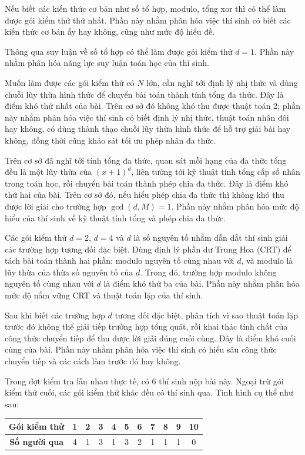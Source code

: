 \documentclass[11pt]{article}
\begin{document}
Nếu biết các kiến thức cơ bản như số tổ hợp, modulo, tổng xor thì có thể làm
được gói kiểm thử thứ nhất. Phần này nhằm phân hóa việc thí sinh có biết các
kiến thức cơ bản ấy hay không, cũng như mức độ hiểu đề.

Thông qua suy luận về số tổ hợp có thể làm được gói kiểm thử \(d=1\). Phần
này nhằm phân hóa năng lực suy luận toán học của thí sinh.

Muốn làm được các gói kiểm thử có \(N\) lớn, cần nghĩ tới định lý nhị thức và
dùng chuỗi lũy thừa hình thức để chuyển bài toán thành tính tổng đa thức. Đây
là điểm khó thứ nhất của bài. Trên cơ sở đó không khó thu được thuật toán 2;
phần này nhằm phân hóa việc thí sinh có biết định lý nhị thức, thuật toán
nhân đôi hay không, có dùng thành thạo chuỗi lũy thừa hình thức để hỗ trợ giải
bài hay không, đồng thời cũng khảo sát tối ưu phép nhân đa thức.

Trên cơ sở đã nghĩ tới tính tổng đa thức, quan sát mỗi hạng của đa thức tổng
đều là một lũy thừa của \((x+1)^d\), liên tưởng tới kỹ thuật tính tổng cấp số
nhân trong toán học, rồi chuyển bài toán thành phép chia đa thức. Đây là điểm
khó thứ hai của bài. Trên cơ sở đó, nếu hiểu phép chia đa thức thì không khó
thu được lời giải cho trường hợp \(\gcd(d,M)=1\). Phần này nhằm phân hóa mức
độ hiểu của thí sinh về kỹ thuật tính tổng và phép chia đa thức.

Các gói kiểm thử \(d=2\), \(d=4\) và \(d\) là số nguyên tố nhằm dẫn dắt thí
sinh giải các trường hợp tương đối đặc biệt. Dùng định lý phần dư Trung Hoa
(CRT) để tách bài toán thành hai phần: modulo nguyên tố cùng nhau với \(d\),
và modulo là lũy thừa của thừa số nguyên tố của \(d\). Trong đó, trường hợp
modulo không nguyên tố cùng nhau với \(d\) là điểm khó thứ ba của bài. Phần
này nhằm phân hóa mức độ nắm vững CRT và thuật toán lặp của thí sinh.

Sau khi biết các trường hợp \(d\) tương đối đặc biệt, phân tích vì sao thuật
toán lặp trước đó không thể giải tiếp trường hợp tổng quát, rồi khai thác
tính chất của công thức chuyển tiếp để thu được lời giải đúng cuối cùng. Đây
là điểm khó cuối cùng của bài. Phần này nhằm phân hóa việc thí sinh có hiểu
sâu công thức chuyển tiếp và các cách làm trước đó hay không.

Trong đợt kiểm tra lẫn nhau thực tế, có 6 thí sinh nộp bài này. Ngoại trừ gói
kiểm thử cuối, các gói kiểm thử khác đều có thí sinh qua. Tình hình cụ thể như
sau:

\begin{center}
\begin{tabular}{c c c c c c c c c c c}
\textbf{Gói kiểm thử} & 1 & 2 & 3 & 4 & 5 & 6 & 7 & 8 & 9 & 10 \\
\hline
\textbf{Số người qua} & 4 & 1 & 3 & 1 & 3 & 2 & 1 & 1 & 1 & 0 \\
\end{tabular}
\end{center}
\end{document}
